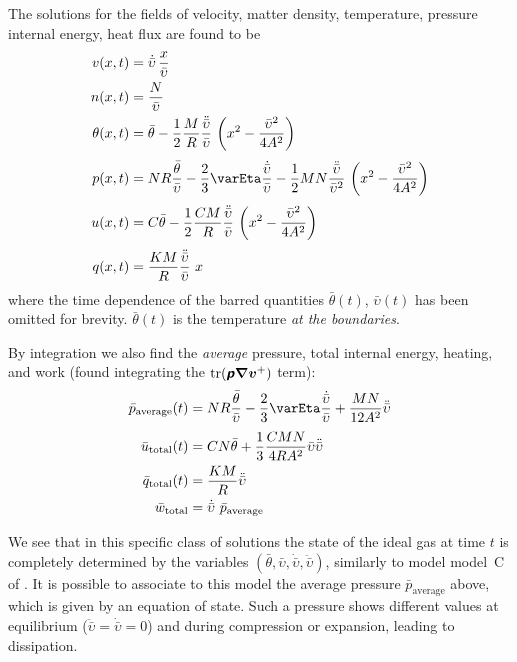 \documentclass[\ifafour a4paper,12pt,\else a5paper,10pt,\fi%
onecolumn,oneside,article,%
british%
]{memoir}
\theoremstyle{remark}
\theoremstyle{innote}
\newcommand*{\mathte}[1]{\textbf{\textit{\textsf{#1}}}}
\newcommand*{\nabl}{\bm{\nabla}}%
\DeclareMathOperator{\tr}{tr}%
\renewcommand*{\|}[1][]{\nonscript\,#1\vert\nonscript\;\mathopen{}}
\newcommand*{\yno}{N}
\newcommand*{\yt}{\theta}
\newcommand*{\yVb}{\bar{\upsilon}}
\newcommand*{\yVd}{\dot{\yVb}}
\newcommand*{\yVdd}{\ddot{\yVb}}
\newcommand*{\yub}{\bar{u}}
\newcommand*{\yqb}{\bar{q}}
\newcommand*{\ywb}{\bar{w}}
\newcommand*{\yv}{\bm{v}}
\newcommand*{\yp}{\mathte{p}}
\newcommand*{\yE}{\varEta}
\newcommand*{\yC}{C}
\newcommand*{\ytb}{\bar{\yt}}
\newcommand*{\ypb}{\bar{p}}
\begin{document}
The solutions for the fields of velocity, matter density,  temperature, pressure
internal energy, heat flux are found to be
\begin{align}
  \label{eq:v_motion}
  v(x,t) &= \yVd\, \frac{x}{\yVb}
\\
\label{eq:n_motion}
n(x,t) &= \frac{\yno}{\yVb}
\\
\label{eq:T_motion}
  \yt(x,t) &= \ytb - \frac{1}{2} \frac{M}{R}\frac{\yVdd}{\yVb}\
             \biggl(x^{2}-\frac{\yVb^{2}}{4A^{2}}\biggr)
\\[\jot]
\label{eq:p_motion}
  p(x,t) &= NR \frac{\ytb}{\yVb} - \frac{2}{3}\yE \frac{\yVd}{\yVb}
           - \frac{1}{2}MN\frac{\yVdd}{\yVb^{2}}\
           \biggl(x^{2}-\frac{\yVb^{2}}{4A^{2}}\biggr)
  \\[\jot]
\label{eq:u_motion}
  u(x,t) &= \yC \ytb -
                           \frac{1}{2} \frac{\yC M}{R}\frac{\yVdd}{\yVb}\
             \biggl(x^{2}-\frac{\yVb^{2}}{4A^{2}}\biggr)
  \\[\jot]
\label{eq:q_motion}
q(x,t) &= \frac{KM}{R} \frac{\yVdd}{\yVb}\ x
\end{align}
where the time dependence of the barred quantities $\ytb(t)$, $\yVb(t)$ has
been omitted for brevity. $\ytb(t)$ is the temperature \emph{at the boundaries}.

By integration we also find the \emph{average} pressure, total internal
energy, heating, and work (found integrating the $\tr(\yp\nabl\yv^{+})$
term):
\begin{align}
  \label{eq:p_motion_avg}
  \ypb_{\text{average}}(t) &= NR \frac{\ytb}{\yVb}
                          - \frac{2}{3}\yE \frac{\yVd}{\yVb}
                          +\frac{MN}{12 A^{2}} \yVdd
  \\[\jot]
\label{eq:u_motion_tot}
  \yub_{\text{total}}(t) &= \yC N \ytb +
                           \frac{1}{3}\frac{\yC MN}{4RA^{2}} \yVb\yVdd
  \\
\label{eq:q_motion_tot}
\yqb_{\text{total}}(t) &= \frac{KM}{R} \yVdd
  \\
\label{eq:work_tot}
  \ywb_{\text{total}} &=
  \yVd \ \ypb_{\text{average}}
\end{align}

We see that in this specific class of solutions the state of the ideal gas
at time $t$ is completely determined by the variables
$(\ytb,\yVb,\yVd,\yVdd)$, similarly to model model~C of
\citeauthor{pekaretal2014}. It is possible to associate to this model the
average pressure $\ypb_{\text{average}}$ above, which is given by an
equation of state. Such a pressure shows different values at equilibrium
($\yVdd=\yVd=0$) and during compression or expansion, leading to
dissipation.
\end{document}
